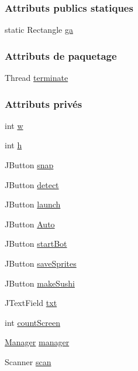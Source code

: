 \subsubsection*{Attributs publics statiques}
\begin{DoxyCompactItemize}
\item 
static Rectangle \hyperlink{classToolBox_a84023d6084fa90a7c5efb7802be85879}{ga}
\end{DoxyCompactItemize}
\subsubsection*{Attributs de paquetage}
\begin{DoxyCompactItemize}
\item 
Thread \hyperlink{classToolBox_a4a4a941d9d6b7892fab6299754098d16}{terminate}
\end{DoxyCompactItemize}
\subsubsection*{Attributs privés}
\begin{DoxyCompactItemize}
\item 
int \hyperlink{classToolBox_ab44fa7732e3d081f6a771c27c503cb8d}{w}
\item 
int \hyperlink{classToolBox_a6e89d6e988fb5e888ffc7714471b4054}{h}
\item 
J\+Button \hyperlink{classToolBox_aa32b3efdf92088255ff9abcf0f521bd3}{snap}
\item 
J\+Button \hyperlink{classToolBox_a3cede081b593755a3a78db32cd2264cc}{detect}
\item 
J\+Button \hyperlink{classToolBox_ae08f070c43c9a1562cf398285229cb4d}{launch}
\item 
J\+Button \hyperlink{classToolBox_acb5fb7b963daea2d9f408b72320e583d}{Auto}
\item 
J\+Button \hyperlink{classToolBox_a48363bbac3348d479b56d449f022610c}{start\+Bot}
\item 
J\+Button \hyperlink{classToolBox_a62927d69e11b6fca098cd75b90ea381c}{save\+Sprites}
\item 
J\+Button \hyperlink{classToolBox_a68b5406bfa4432447a5ca40e3645d1e9}{make\+Sushi}
\item 
J\+Text\+Field \hyperlink{classToolBox_a0872e43afdb03a8ea032ba9091a741c0}{txt}
\item 
int \hyperlink{classToolBox_abb9afac1f090ebb2fb677174cb47655c}{count\+Screen}
\item 
\hyperlink{classManager}{Manager} \hyperlink{classToolBox_acc0e44c90d5e0999f6a891b723a1abb7}{manager}
\item 
Scanner \hyperlink{classToolBox_a7ec79aee5da9de2ac809cea59ee7bd52}{scan}
\end{DoxyCompactItemize}
